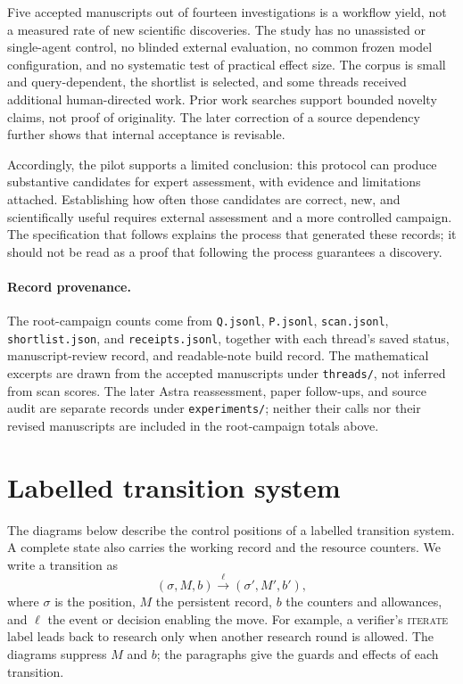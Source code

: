 \documentclass[11pt,a4paper]{article}
\newcommand{\st}[1]{\textsc{#1}}
\newcommand{\file}[1]{\texttt{#1}}
\begin{document}
Five accepted manuscripts out of fourteen investigations is a workflow yield,
not a measured rate of new scientific discoveries. The study has no unassisted
or single-agent control, no blinded external evaluation, no common frozen model
configuration, and no systematic test of practical effect size. The corpus is
small and query-dependent, the shortlist is selected, and some threads received
additional human-directed work. Prior work searches support bounded novelty
claims, not proof of originality. The later correction of a source dependency
further shows that internal acceptance is revisable.

Accordingly, the pilot supports a limited conclusion: this protocol can produce
substantive candidates for expert assessment, with evidence and limitations
attached. Establishing how often those candidates are correct, new, and
scientifically useful requires external assessment and a more controlled
campaign. The specification that follows explains the process that generated
these records; it should not be read as a proof that following the process
guarantees a discovery.

\paragraph{Record provenance.}
The root-campaign counts come from \file{Q.jsonl}, \file{P.jsonl},
\file{scan.jsonl}, \file{shortlist.json}, and \file{receipts.jsonl}, together
with each thread's saved status, manuscript-review record, and readable-note
build record. The mathematical excerpts are drawn from the accepted manuscripts
under \file{threads/}, not inferred from scan scores. The later Astra
reassessment, paper follow-ups, and source audit are separate records under
\file{experiments/}; neither their calls nor their revised manuscripts are
included in the root-campaign totals above.


\section{Labelled transition system}

The diagrams below describe the control positions of a labelled transition
system. A complete state also carries the working record and the resource
counters. We write a transition as
\[
  (\sigma,M,b)\xrightarrow{\ell}(\sigma',M',b'),
\]
where \(\sigma\) is the position, \(M\) the persistent record, \(b\) the
counters and allowances, and \(\ell\) the event or decision enabling the move.
For example, a verifier's \st{iterate} label leads back to research only when
another research round is allowed. The diagrams suppress \(M\) and \(b\); the
paragraphs give the guards and effects of each transition.
\end{document}
